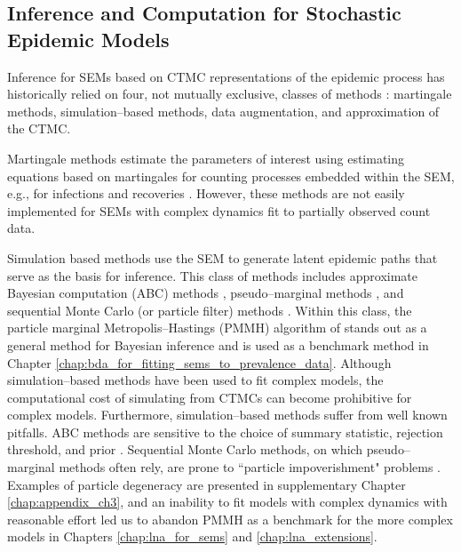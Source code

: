 \subsection{Inference and Computation for Stochastic Epidemic Models}
\label{subsec:sem_exact_inf}
Inference for SEMs based on CTMC representations of the epidemic process has historically relied on four, not mutually exclusive, classes of methods \cite{oneill2010}: martingale methods, simulation--based methods, data augmentation, and approximation of the CTMC. 

Martingale methods estimate the parameters of interest using estimating equations based on martingales for counting processes embedded within the SEM, e.g., for infections and recoveries \citep{becker1977general, watson1981application, sudbury1985proportion, andersson2000stochastic, lindenstrand2013estimation}. However, these methods are not easily implemented for SEMs with complex dynamics fit to partially observed count data.

Simulation based methods use the SEM to generate latent epidemic paths that serve as the basis for inference. This class of methods includes approximate Bayesian computation (ABC) methods \citep{mckinley2009,toni2009,mckinley2018approximate}, pseudo--marginal methods \citep{mckinley2014simulation,shubin2016revealing}, and sequential Monte Carlo (or particle filter) methods \cite{andrieu2010particle, dukic2012,golightly2018efficient,ionides2011iterated,koepke2016predictive,toni2009}. Within this class, the particle marginal Metropolis--Hastings (PMMH) algorithm of \cite{andrieu2010particle} stands out as a general method for Bayesian inference and is used as a benchmark method in Chapter \ref{chap:bda_for_fitting_sems_to_prevalence_data}. Although simulation--based methods have been used to fit complex models, the computational cost of simulating from CTMCs can become prohibitive for complex models. Furthermore, simulation--based methods suffer from well known pitfalls. ABC methods are sensitive to the choice of summary statistic, rejection threshold, and prior  \cite{toni2009}. Sequential Monte Carlo methods, on which pseudo--marginal methods often rely, are prone to ``particle impoverishment" problems \cite{cappe2006inference, dukic2012}. Examples of particle degeneracy are presented in supplementary Chapter \ref{chap:appendix_ch3}, and an inability to fit models  with complex dynamics with reasonable effort led us to abandon PMMH as a benchmark for the more complex models in Chapters \ref{chap:lna_for_sems} and \ref{chap:lna_extensions}. 


